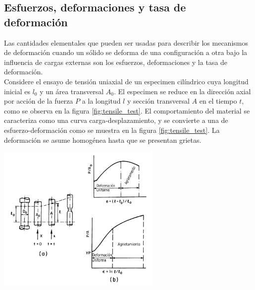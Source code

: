\subsection{Esfuerzos, deformaciones y tasa de deformación}

Las cantidades elementales que pueden ser usadas para describir los mecanismos de deformación 
cuando un sólido se deforma de una configuración a otra bajo la influencia de cargas externas 
son los esfuerzos, deformaciones y la tasa de deformación. ~\cite{kobayashi1989} \\

Considere el ensayo de tensión uniaxial de un especimen cilíndrico cuya longitud inicial 
es $l_0$ y un área transversal $A_0$. El especimen se reduce en la dirección axial 
por acción de la fuerza $P$ a la longitud $l$ y sección transversal $A$ en el tiempo 
$t$, como se observa en la figura \ref{fig:tensile_test}. El comportamiento del material 
se caracteriza como una curva carga-desplazamiento, y se convierte a una de 
esfuerzo-deformación como se muestra en la figura \ref{fig:tensile_test}. La deformación 
se asume homogénea hasta que se presentan grietas. ~\cite{kobayashi1989} \\

\begin{center}
\includegraphics[width=0.6\textwidth]{src/ch2/tensile_test.pdf}
\label{fig:tensile_test}
\end{center}


